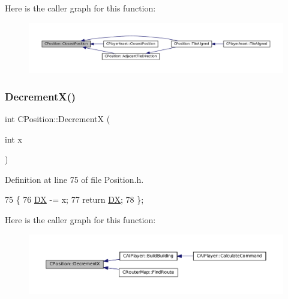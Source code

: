 Here is the caller graph for this function\+:
\nopagebreak
\begin{figure}[H]
\begin{center}
\leavevmode
\includegraphics[width=350pt]{classCPosition_a91fd43eeb2c894bcb7577ae87247b726_icgraph}
\end{center}
\end{figure}
\hypertarget{classCPosition_a64f0d8ef8ca26c8b66b0997b3b132416}{}\label{classCPosition_a64f0d8ef8ca26c8b66b0997b3b132416} 
\subsubsection{\texorpdfstring{Decrement\+X()}{DecrementX()}}
{\footnotesize\ttfamily int C\+Position\+::\+DecrementX (\begin{DoxyParamCaption}\item[{int}]{x }\end{DoxyParamCaption})\hspace{0.3cm}{\ttfamily [inline]}}



Definition at line 75 of file Position.\+h.


\begin{DoxyCode}
75                              \{
76             \hyperlink{classCPosition_a28445f9b872169715919074d82044eda}{DX} -= x; 
77             \textcolor{keywordflow}{return} \hyperlink{classCPosition_a28445f9b872169715919074d82044eda}{DX};
78         \};
\end{DoxyCode}
Here is the caller graph for this function\+:
\nopagebreak
\begin{figure}[H]
\begin{center}
\leavevmode
\includegraphics[width=350pt]{classCPosition_a64f0d8ef8ca26c8b66b0997b3b132416_icgraph}
\end{center}
\end{figure}
\hypertarget{classCPosition_a51ee44d9e0457d6277567fd8a66fdec7}{}\label{classCPosition_a51ee44d9e0457d6277567fd8a66fdec7} 
